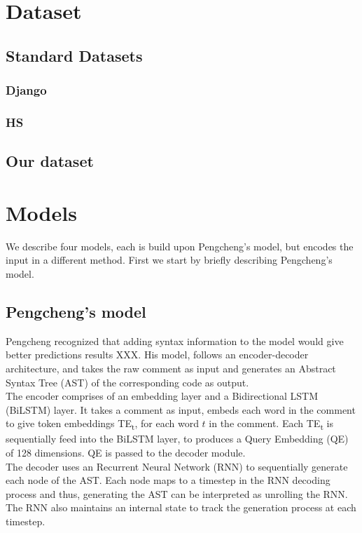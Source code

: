 \documentclass{IEEEtran}
\begin{document}
    \section{Dataset}
      \subsection{Standard Datasets}
        \blindtext
        \subsubsection{Django}
        \blindtext
        \subsubsection{HS}
        \blindtext
      \subsection{Our dataset}
      \blindtext

    \section{Models}
    We describe four models, each is build upon Pengcheng's model, but encodes the input in a 
    different method. First we start by briefly describing Pengcheng's model.

      \subsection{Pengcheng's model}
      Pengcheng recognized that adding syntax information to the model would give better
      predictions results XXX. His model, follows an encoder-decoder architecture, and takes
      the raw comment as input and generates an Abstract Syntax Tree (AST) of the corresponding 
      code as output. \\
      \hspace*{4mm}The encoder comprises of an embedding layer and a Bidirectional LSTM (BiLSTM)
      layer. It takes a comment as input, embeds each word in the comment to give token embeddings
      TE\textsubscript{t}, for each word $ t $ in the comment. Each TE\textsubscript{t} is 
      sequentially feed into the 
      BiLSTM layer, to produces a Query Embedding (QE) of 128 dimensions. QE is passed to the
      decoder module. \\
      \hspace*{4mm}The decoder uses an Recurrent Neural Network (RNN) to sequentially generate 
      each node of the AST. Each node maps to a timestep in the RNN decoding process and thus, 
      generating the AST can be interpreted as unrolling the RNN. The RNN also maintains an 
      internal state to track the generation process at each timestep.
\end{document}
